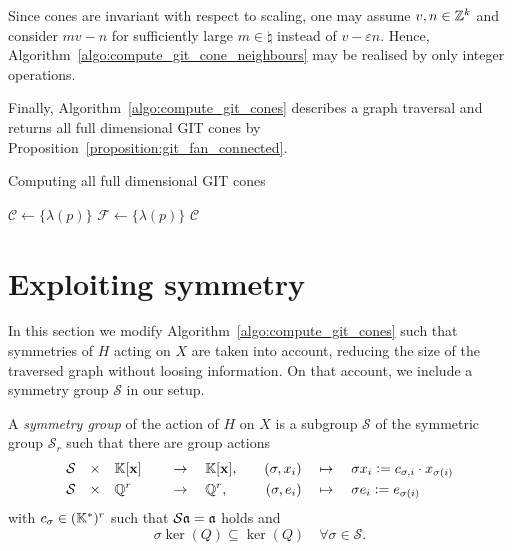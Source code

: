 \begin{remark}
	Since cones are invariant with respect to scaling, one may assume $v,n\in\mathbb{Z}^k$ and consider $mv-n$ for sufficiently large $m\in\natural$ instead of $v-\varepsilon n$. Hence, Algorithm~\ref{algo:compute_git_cone_neighbours} may be realised by only integer operations.
\end{remark}

Finally, Algorithm~\ref{algo:compute_git_cones} describes a graph traversal and returns all full dimensional GIT cones by Proposition~\ref{proposition:git_fan_connected}.

\begin{algorithm}
	\caption{Computing all full dimensional GIT cones}
	\label{algo:compute_git_cones}
	
	\BlankLine
	$\mathcal{C} \leftarrow \{\lambda(p)\}$\;
	$\mathcal{F} \leftarrow \{\lambda(p)\}$\;
	\Return $\mathcal{C}$\;
\end{algorithm}

\section{Exploiting symmetry}

In this section we modify Algorithm~\ref{algo:compute_git_cones} such that symmetries of $H$ acting on $X$ are taken into account, reducing the size of the traversed graph without loosing information. On that account, we include a symmetry group $\mathcal{S}$ in our setup.

\begin{defi}
	\label{definition:symmetry_group}
	A \emph{symmetry group} of the action of $H$ on $X$ is a subgroup $\mathcal{S}$ of the symmetric group $\mathcal{S}_r$ such that there are group actions
	\begin{alignat*}{5}
		\mathcal{S} \quad\times\quad & \mathbb{K}[\mathbf{x}] && \quad\rightarrow\quad \mathbb{K}[\mathbf{x}],\quad & (\sigma, x_i) & \quad\mapsto\quad \sigma x_i \mathrel{\mathop:}= c_{\sigma,i} \cdot x_{\sigma(i)} \\
		\mathcal{S} \quad\times\quad & \mathbb{Q}^r && \quad\rightarrow\quad \mathbb{Q}^r,\quad & (\sigma, e_i) & \quad\mapsto\quad \sigma e_i \mathrel{\mathop:}= e_{\sigma(i)}
	\end{alignat*}
	with $c_\sigma\in(\mathbb{K}^*)^r$ such that $\mathcal{S}\mathfrak{a} = \mathfrak{a}$ holds and
	$$\sigma \ker(Q) \subseteq \ker(Q)\quad\forall\sigma\in \mathcal{S}.$$
\end{defi}

